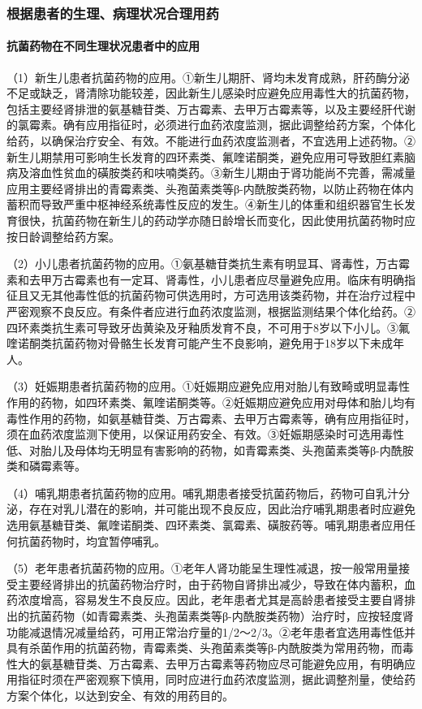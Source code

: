 \subsubsection{根据患者的生理、病理状况合理用药}
\paragraph{抗菌药物在不同生理状况患者中的应用}

（1）新生儿患者抗菌药物的应用。①新生儿期肝、肾均未发育成熟，肝药酶分泌不足或缺乏，肾清除功能较差，因此新生儿感染时应避免应用毒性大的抗菌药物，包括主要经肾排泄的氨基糖苷类、万古霉素、去甲万古霉素等，以及主要经肝代谢的氯霉素。确有应用指征时，必须进行血药浓度监测，据此调整给药方案，个体化给药，以确保治疗安全、有效。不能进行血药浓度监测者，不宜选用上述药物。②新生儿期禁用可影响生长发育的四环素类、氟喹诺酮类，避免应用可导致胆红素脑病及溶血性贫血的磺胺类药和呋喃类药。③新生儿期由于肾功能尚不完善，需减量应用主要经肾排出的青霉素类、头孢菌素类等β-内酰胺类药物，以防止药物在体内蓄积而导致严重中枢神经系统毒性反应的发生。④新生儿的体重和组织器官生长发育很快，抗菌药物在新生儿的药动学亦随日龄增长而变化，因此使用抗菌药物时应按日龄调整给药方案。

（2）小儿患者抗菌药物的应用。①氨基糖苷类抗生素有明显耳、肾毒性，万古霉素和去甲万古霉素也有一定耳、肾毒性，小儿患者应尽量避免应用。临床有明确指征且又无其他毒性低的抗菌药物可供选用时，方可选用该类药物，并在治疗过程中严密观察不良反应。有条件者应进行血药浓度监测，根据监测结果个体化给药。②四环素类抗生素可导致牙齿黄染及牙釉质发育不良，不可用于8岁以下小儿。③氟喹诺酮类抗菌药物对骨骼生长发育可能产生不良影响，避免用于18岁以下未成年人。

（3）妊娠期患者抗菌药物的应用。①妊娠期应避免应用对胎儿有致畸或明显毒性作用的药物，如四环素类、氟喹诺酮类等。②妊娠期应避免应用对母体和胎儿均有毒性作用的药物，如氨基糖苷类、万古霉素、去甲万古霉素等，确有应用指征时，须在血药浓度监测下使用，以保证用药安全、有效。③妊娠期感染时可选用毒性低、对胎儿及母体均无明显有害影响的药物，如青霉素类、头孢菌素类等β-内酰胺类和磷霉素等。

（4）哺乳期患者抗菌药物的应用。哺乳期患者接受抗菌药物后，药物可自乳汁分泌，存在对乳儿潜在的影响，并可能出现不良反应，因此治疗哺乳期患者时应避免选用氨基糖苷类、氟喹诺酮类、四环素类、氯霉素、磺胺药等。哺乳期患者应用任何抗菌药物时，均宜暂停哺乳。

（5）老年患者抗菌药物的应用。①老年人肾功能呈生理性减退，按一般常用量接受主要经肾排出的抗菌药物治疗时，由于药物自肾排出减少，导致在体内蓄积，血药浓度增高，容易发生不良反应。因此，老年患者尤其是高龄患者接受主要自肾排出的抗菌药物（如青霉素类、头孢菌素类等β-内酰胺类药物）治疗时，应按轻度肾功能减退情况减量给药，可用正常治疗量的1/2～2/3。②老年患者宜选用毒性低并具有杀菌作用的抗菌药物，青霉素类、头孢菌素类等β-内酰胺类为常用药物，而毒性大的氨基糖苷类、万古霉素、去甲万古霉素等药物应尽可能避免应用，有明确应用指征时须在严密观察下慎用，同时应进行血药浓度监测，据此调整剂量，使给药方案个体化，以达到安全、有效的用药目的。
